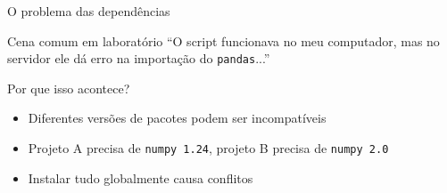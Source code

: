\begin{frame}[fragile, shrink=5]{O problema das dependências}
\begin{alertblock}{Cena comum em laboratório}
``O script funcionava no meu computador, mas no servidor ele dá erro na importação do \texttt{pandas}...''
\end{alertblock}

\vspace{0.3cm}

\begin{block}{Por que isso acontece?}
\begin{itemize}
    \item Diferentes versões de pacotes podem ser incompatíveis
    \item Projeto A precisa de \texttt{numpy 1.24}, projeto B precisa de \texttt{numpy 2.0}
    \item Instalar tudo globalmente causa conflitos
\end{itemize}
\end{block}

\vspace{0.2cm}

\end{frame}

